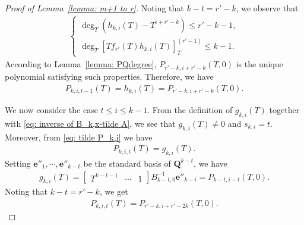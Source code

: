 \documentclass[10pt,a4paper]{amsart}
\newcommand{\Q}{\mathbf{Q}}
\begin{document}
\begin{proof}[Proof of Lemma~\ref{lemma: m+1 to r}]
Noting that $k-t=r'-k$, we observe that
    \begin{align*}
        \begin{cases}
            \deg_T (h_{k,i}(T)-T^{i+r'-k})\leq r'-k-1,\\
            \deg_T [Tf_{r'}(T)h_{k,i}(T)]_{T}^{(r'-1)} \leq k-1.
        \end{cases}
    \end{align*}
According to Lemma~\ref{lemma: PQdegree}, $P_{r'-k,i+r'-k}(T,0)$ is the unique polynomial satisfying such properties.
Therefore, we have
    \begin{align*}
        P_{k,i,t-1}(T)
        =h_{k,i}(T)
        =P_{r'-k,i+r'-k}(T,0).
    \end{align*}



We now consider the case $t\leq i\leq k-1$. From the definition of $g_{k,i}(T)$ together with \eqref{eq: inverse of B_k,x-tilde A}, we see that $g_{k,i}(T)\neq 0$ and $s_{k,i}=t$. Moreover, from \eqref{eq: tilde P_k,i} we have
    \begin{align*}
        P_{k,i,t}(T) =g_{k,i}(T).
    \end{align*}
Setting $\mathbf{e}''_1,\cdots,\mathbf{e}''_{k-t}$ be the standard basis of $\Q^{k-t}$, we have
    \begin{align*}
        g_{k,i}(T)
        =
        \begin{bmatrix}
            T^{k-t-1} & \cdots & 1
        \end{bmatrix}
        B_{k-t,0}^{-1}
        \mathbf{e}''_{k-i}=P_{k-t,i-t}(T,0).
    \end{align*}
Noting that $k-t=r'-k$, we get
    \begin{align*}
        P_{k,i,t}(T)=P_{r'-k,i+r'-2k}(T,0).
    \end{align*}



\end{proof}
\end{document}
